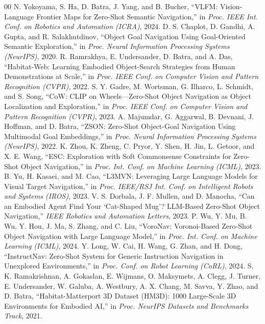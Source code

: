\documentclass[conference]{IEEEtran}
\begin{document}
\begin{thebibliography}{00}
 N. Yokoyama, S. Ha, D. Batra, J. Yang, and B. Bucher, ``VLFM: Vision-Language Frontier Maps for Zero-Shot Semantic Navigation,'' in \emph{Proc. IEEE Int. Conf. on Robotics and Automation (ICRA)}, 2024.
 D. S. Chaplot, D. Gandhi, A. Gupta, and R. Salakhutdinov, ``Object Goal Navigation Using Goal-Oriented Semantic Exploration,'' in \emph{Proc. Neural Information Processing Systems (NeurIPS)}, 2020.
 R. Ramrakhya, E. Undersander, D. Batra, and A. Das, ``Habitat-Web: Learning Embodied Object-Search Strategies from Human Demonstrations at Scale,'' in \emph{Proc. IEEE Conf. on Computer Vision and Pattern Recognition (CVPR)}, 2022.
 S. Y. Gadre, M. Wortsman, G. Ilharco, L. Schmidt, and S. Song, ``CoW: CLIP on Wheels---Zero-Shot Object Navigation as Object Localization and Exploration,'' in \emph{Proc. IEEE Conf. on Computer Vision and Pattern Recognition (CVPR)}, 2023.
 A. Majumdar, G. Aggarwal, B. Devnani, J. Hoffman, and D. Batra, ``ZSON: Zero-Shot Object-Goal Navigation Using Multimodal Goal Embeddings,'' in \emph{Proc. Neural Information Processing Systems (NeurIPS)}, 2022.
 K. Zhou, K. Zheng, C. Pryor, Y. Shen, H. Jin, L. Getoor, and X. E. Wang, ``ESC: Exploration with Soft Commonsense Constraints for Zero-Shot Object Navigation,'' in \emph{Proc. Int. Conf. on Machine Learning (ICML)}, 2023.
 B. Yu, H. Kasaei, and M. Cao, ``L3MVN: Leveraging Large Language Models for Visual Target Navigation,'' in \emph{Proc. IEEE/RSJ Int. Conf. on Intelligent Robots and Systems (IROS)}, 2023.
 V. S. Dorbala, J. F. Mullen, and D. Manocha, ``Can an Embodied Agent Find Your `Cat-Shaped Mug'? LLM-Based Zero-Shot Object Navigation,'' \emph{IEEE Robotics and Automation Letters}, 2023.
 P. Wu, Y. Mu, B. Wu, Y. Hou, J. Ma, S. Zhang, and C. Liu, ``VoroNav: Voronoi-Based Zero-Shot Object Navigation with Large Language Model,'' in \emph{Proc. Int. Conf. on Machine Learning (ICML)}, 2024.
 Y. Long, W. Cai, H. Wang, G. Zhan, and H. Dong, ``InstructNav: Zero-Shot System for Generic Instruction Navigation in Unexplored Environments,'' in \emph{Proc. Conf. on Robot Learning (CoRL)}, 2024.
 S. K. Ramakrishnan, A. Gokaslan, E. Wijmans, O. Maksymets, A. Clegg, J. Turner, E. Undersander, W. Galuba, A. Westbury, A. X. Chang, M. Savva, Y. Zhao, and D. Batra, ``Habitat-Matterport 3D Dataset (HM3D): 1000 Large-Scale 3D Environments for Embodied AI,'' in \emph{Proc. NeurIPS Datasets and Benchmarks Track}, 2021.

\end{thebibliography}
\end{document}
